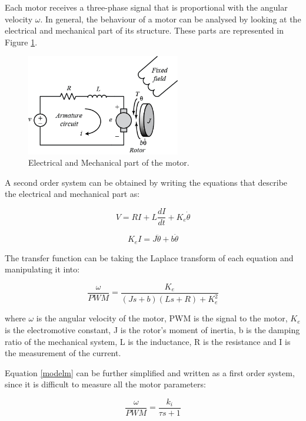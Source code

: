 Each motor receives a three-phase signal that is proportional with the angular velocity $\omega$. In general, the behaviour of a motor can be analysed by looking at the electrical and mechanical part of its structure. These parts are represented in Figure \ref{dc}. 

\begin{figure}[H]
  \centering
    \includegraphics[width=0.6\textwidth]{images/dc.png}
	\caption{Electrical and Mechanical part of the motor.\cite{MotorFig}}
	\label{dc}
\end{figure}

A second order system can be obtained by writing the equations that describe the electrical and mechanical part as:

\begin{equation}
	V=RI+L\frac{dI}{dt}+K_{e}\dot{\theta}
\end{equation}

\begin{equation}
   K_{e}I = J \ddot{\theta}+b\dot{\theta}
\end{equation}

The transfer function can be taking the Laplace transform of each equation and manipulating it into:

\begin{equation}
\label{modelm} 
   \frac{\omega}{PWM}=\frac{K_{e}}{(Js+b)(Ls+R)+K_{e}^{2}}
\end{equation}

where $\omega$ is the angular velocity of the motor, PWM is the signal to the motor, $K_{e}$ is the electromotive constant, J is the rotor's moment of inertia, b is the damping ratio of the mechanical system, L is the inductance, R is the resistance and I is the measurement of the current.

Equation \ref{modelm} can be further simplified and written as a first order system, since it is difficult to measure all the motor parameters:\cite{Report1}

\begin{equation}
   \frac{\omega}{PWM}=\frac{k_{i}}{\tau s+1}
\end{equation}


